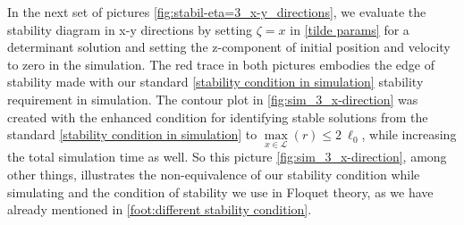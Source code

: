 In the next set of pictures \ref{fig:stabil-eta=3_x-y_directions}, we evaluate the stability diagram in x-y directions by setting $\zeta = x$ in \eqref{tilde params} for a determinant solution and setting the z-component of initial position and velocity to zero in the simulation. The red trace in both pictures embodies the edge of stability made with our standard \eqref{stability condition in simulation} stability requirement in simulation. The contour plot in \ref{fig:sim_3_x-direction} was created with the enhanced condition for identifying stable solutions from the standard \eqref{stability condition in simulation} to $\max\limits_{x \in \mathcal{L}}(r) \leq 2 \ \ell_0$, while increasing the total simulation time as well. So this picture \ref{fig:sim_3_x-direction}, among other things, illustrates the non-equivalence of our stability condition while simulating and the condition of stability we use in Floquet theory, as we have already mentioned in \ref{foot:different stability condition}. 

